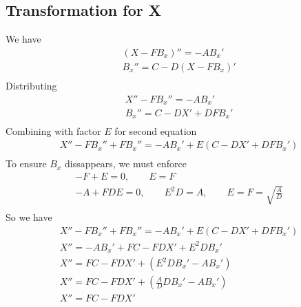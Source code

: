 \documentclass[11pt]{article}
\begin{document}
\subsection{Transformation for X}
We have
\begin{equation}\begin{aligned}
(X - F B_x)''   = - A B_x' \\
B_x'' = C - D (X - F B_x)' \\
\end{aligned} \end{equation}
Distributing
\begin{equation}\begin{aligned}
X'' - F B_x''   = - A B_x' \\
B_x'' = C - D X' + D F B_x' \\
\end{aligned} \end{equation}
Combining with factor $E$ for second equation
\begin{equation}\begin{aligned}
X'' - F B_x'' + FB_x''   = - A B_x' + E(C - D X' + D F B_x') \\
\end{aligned} \end{equation}
To ensure $B_x$ dissappears, we must enforce
\begin{equation}\begin{aligned}
-F + E = 0, \qquad E = F \\
-A + FDE = 0,\qquad E^2D = A, \qquad E = F = \sqrt{\frac{A}{D}}\\
\end{aligned} \end{equation}
So we have
\begin{equation}\begin{aligned}
X'' - F B_x'' + FB_x''   = - A B_x' + E(C - D X' + D F B_x') \\
X'' = - A B_x' + FC - FD X' + E^2 D B_x' \\
X'' = FC - FD X' + (E^2 D B_x' - A B_x') \\
X'' = FC - FD X' + \left(\frac{A}{D} D B_x' - A B_x' \right) \\
X'' = FC - FD X' \\
\end{aligned} \end{equation}
\end{document}
